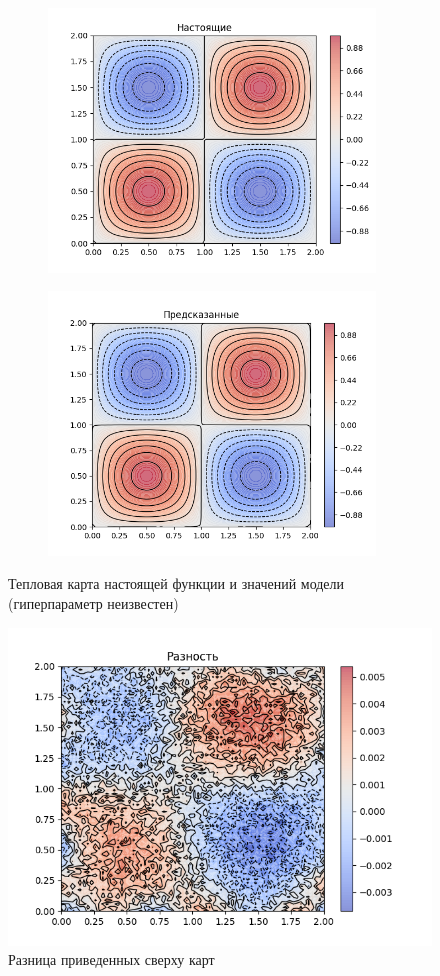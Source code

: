 \begin{figure}[ht!]
    \centering
    \begin{subfigure}{0.4\textwidth}{
        \includegraphics[height=7cm, keepaspectratio]{images/3.png}
    }
    \end{subfigure}
    \hfill
    \begin{subfigure}{0.4\textwidth}{
        \includegraphics[height=7cm, keepaspectratio]{images/4.png}
    }
    \end{subfigure}
    \caption{Тепловая карта настоящей функции и значений модели (гиперпараметр неизвестен)}
\end{figure}

\begin{figure}[ht!]
    \centering
    \includegraphics[width=0.75\hsize]{images/19.png}
    \caption{Разница приведенных сверху карт}
\end{figure}


